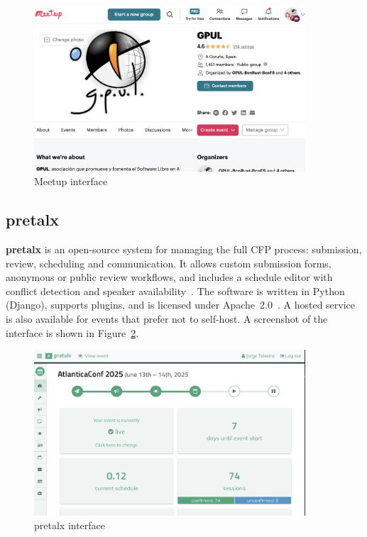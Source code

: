 \begin{figure}[H]
  \centering
  \includegraphics[width=0.9\textwidth]{imaxes/meetup-ui.png}
  \caption{Meetup interface}
  \label{fig:meetup-ui}
\end{figure}

\subsection{pretalx}
\textbf{pretalx} is an open-source system for managing the full CFP process: submission, review, scheduling and communication. It allows custom submission forms, anonymous or public review workflows, and includes a schedule editor with conflict detection and speaker availability~\cite{pretalx-docs}. The software is written in Python (Django), supports plugins, and is licensed under Apache~2.0~\cite{pretalx-license}. A hosted service is also available for events that prefer not to self-host. A screenshot of the interface is shown in Figure~\ref{fig:pretalx-ui}.

\begin{figure}[H]
  \centering
  \includegraphics[width=0.9\textwidth]{imaxes/pretalx.com-ui.png}
  \caption{pretalx interface}
  \label{fig:pretalx-ui}
\end{figure}


